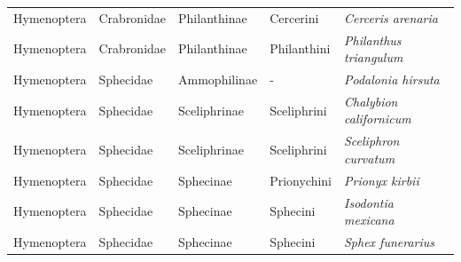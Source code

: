 \begin{table}[]
\begin{tabular}{@{}lllll@{}}
Hymenoptera & Crabronidae & Philanthinae   & Cercerini     & \emph{Cerceris arenaria}           \\
Hymenoptera & Crabronidae & Philanthinae   & Philanthini   & \emph{Philanthus triangulum}       \\
Hymenoptera & Sphecidae   & Ammophilinae   & -             & \emph{Podalonia hirsuta}           \\
Hymenoptera & Sphecidae   & Sceliphrinae   & Sceliphrini   & \emph{Chalybion californicum}      \\
Hymenoptera & Sphecidae   & Sceliphrinae   & Sceliphrini   & \emph{Sceliphron curvatum}         \\
Hymenoptera & Sphecidae   & Sphecinae      & Prionychini   & \emph{Prionyx kirbii}              \\
Hymenoptera & Sphecidae   & Sphecinae      & Sphecini      & \emph{Isodontia mexicana}          \\
Hymenoptera & Sphecidae   & Sphecinae      & Sphecini      & \emph{Sphex funerarius}            \\ 
\bottomrule
\end{tabular}
\end{table}

